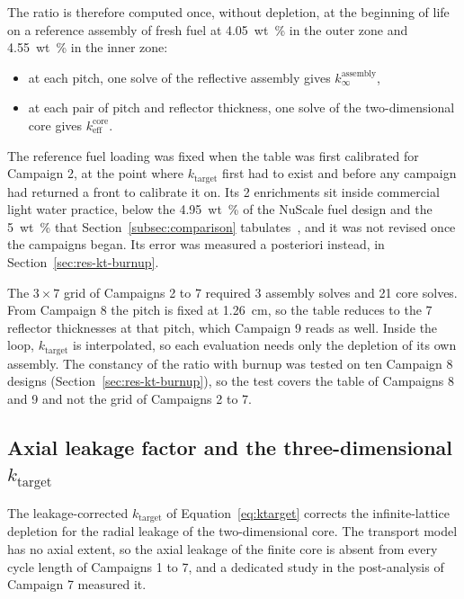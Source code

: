 The ratio is therefore computed once, without depletion, at the beginning
of life on a reference assembly of fresh fuel at \SI{4.05}{wt\%} in
the outer zone and \SI{4.55}{wt\%} in the inner zone:

\begin{itemize}
  \item at each pitch, one solve of the reflective assembly gives
        $k_\infty^\mathrm{assembly}$,

  \item at each pair of pitch and reflector thickness, one solve of the
        two-dimensional core gives $k_\mathrm{eff}^\mathrm{core}$.
\end{itemize}

The reference fuel loading was fixed when the table was first
calibrated for Campaign 2, at the point where $k_\mathrm{target}$ first had to exist and before any campaign had returned a front to calibrate it on.
Its 2 enrichments sit inside commercial light water practice, below
the \SI{4.95}{wt\%} of the NuScale fuel design and the \SI{5}{wt\%}
that Section~\ref{subsec:comparison}
tabulates~\cite{nuscale_htp2_2017,iaea_smr_2024}, and it was not revised
once the campaigns began. Its error was measured a posteriori instead, in
Section~\ref{sec:res-kt-burnup}.

The $3\times7$ grid of Campaigns 2 to 7 required 3 assembly solves and
21 core solves. From Campaign 8 the pitch is fixed at \SI{1.26}{cm}, so
the table reduces to the 7 reflector thicknesses at that pitch, which
Campaign 9 reads as well. Inside the loop, $k_\mathrm{target}$ is
interpolated, so each evaluation needs only the depletion of its own
assembly. The constancy of the ratio with burnup was tested on ten
Campaign 8 designs (Section~\ref{sec:res-kt-burnup}), so the test covers
the table of Campaigns 8 and 9 and not the grid of Campaigns 2 to 7.

\subsection{Axial leakage factor and the three-dimensional \texorpdfstring{$k_\mathrm{target}$}{k-target}}
\label{sec:meth-lax}

The leakage-corrected $k_\mathrm{target}$ of Equation~\eqref{eq:ktarget} corrects the
infinite-lattice depletion for the radial leakage of the
two-dimensional core. The transport model has no axial extent, so the
axial leakage of the finite core is absent from every cycle length of
Campaigns 1 to 7, and a dedicated study in the post-analysis of
Campaign 7 measured it.

